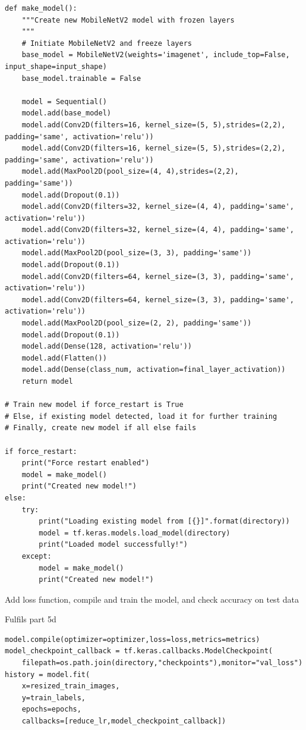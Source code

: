 \documentclass[12pt, letterpaper]{article}
\begin{document}
\begin{mdframed}[backgroundcolor=bg]
\begin{verbatim}
def make_model():
    """Create new MobileNetV2 model with frozen layers
    """
    # Initiate MobileNetV2 and freeze layers
    base_model = MobileNetV2(weights='imagenet', include_top=False, input_shape=input_shape)
    base_model.trainable = False

    model = Sequential()
    model.add(base_model)
    model.add(Conv2D(filters=16, kernel_size=(5, 5),strides=(2,2), padding='same', activation='relu'))
    model.add(Conv2D(filters=16, kernel_size=(5, 5),strides=(2,2), padding='same', activation='relu'))
    model.add(MaxPool2D(pool_size=(4, 4),strides=(2,2), padding='same'))
    model.add(Dropout(0.1))
    model.add(Conv2D(filters=32, kernel_size=(4, 4), padding='same', activation='relu'))
    model.add(Conv2D(filters=32, kernel_size=(4, 4), padding='same', activation='relu'))
    model.add(MaxPool2D(pool_size=(3, 3), padding='same'))
    model.add(Dropout(0.1))
    model.add(Conv2D(filters=64, kernel_size=(3, 3), padding='same', activation='relu'))
    model.add(Conv2D(filters=64, kernel_size=(3, 3), padding='same', activation='relu'))
    model.add(MaxPool2D(pool_size=(2, 2), padding='same'))
    model.add(Dropout(0.1))
    model.add(Dense(128, activation='relu'))
    model.add(Flatten())
    model.add(Dense(class_num, activation=final_layer_activation))
    return model

# Train new model if force_restart is True
# Else, if existing model detected, load it for further training
# Finally, create new model if all else fails

if force_restart:
    print("Force restart enabled")
    model = make_model()
    print("Created new model!")
else:
    try:
        print("Loading existing model from [{}]".format(directory))
        model = tf.keras.models.load_model(directory)
        print("Loaded model successfully!")
    except:
        model = make_model()
        print("Created new model!")

\end{verbatim}
\end{mdframed}

{\large Add loss function, compile and train the model, and check accuracy on test data}

Fulfils part 5d

\begin{mdframed}[backgroundcolor=bg]
\begin{verbatim}
model.compile(optimizer=optimizer,loss=loss,metrics=metrics)
model_checkpoint_callback = tf.keras.callbacks.ModelCheckpoint(
    filepath=os.path.join(directory,"checkpoints"),monitor="val_loss")
history = model.fit(
    x=resized_train_images,
    y=train_labels,
    epochs=epochs,
    callbacks=[reduce_lr,model_checkpoint_callback])
\end{verbatim}
\end{mdframed}
\end{document}
